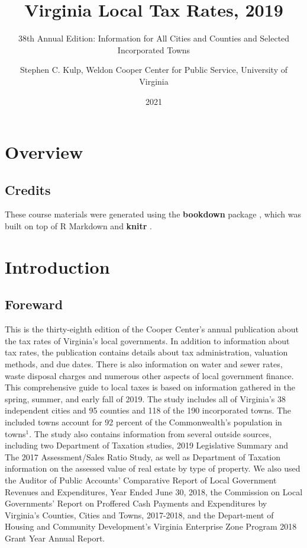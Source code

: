 \documentclass[
]{book}
\title{Virginia Local Tax Rates, 2019}
\subtitle{38th Annual Edition: Information for All Cities and Counties and Selected Incorporated Towns}
\author{Stephen C. Kulp, Weldon Cooper Center for Public Service, University of Virginia}
\date{2021}
\begin{document}
\maketitle

{
\setcounter{tocdepth}{1}
\tableofcontents
}
\hypertarget{overview}{%
\chapter{Overview}\label{overview}}

\hypertarget{credits}{%
\section{Credits}\label{credits}}

These course materials were generated using the \textbf{bookdown} package \citep{R-bookdown}, which was built on top of R Markdown and \textbf{knitr} \citep{xie2015}.

\hypertarget{introduction}{%
\chapter{Introduction}\label{introduction}}

\hypertarget{foreward}{%
\section{Foreward}\label{foreward}}

This is the thirty-eighth edition of the Cooper Center's annual publication about the tax rates of Virginia's local governments. In addition to information about tax rates, the publication contains details about tax administration, valuation methods, and due dates. There is also information on water and sewer rates, waste disposal charges and numerous other aspects of local government finance. This comprehensive guide to local taxes is based on information gathered in the spring, summer, and early fall of 2019. The study includes all of Virginia's 38 independent cities and 95 counties and 118 of the 190 incorporated towns. The included towns account for 92 percent of the Commonwealth's population in towns\(^1\). The study also contains information from several outside sources, including two Department of Taxation studies, 2019 Legislative Summary and The 2017 Assessment/Sales Ratio Study, as well as Department of Taxation information on the assessed value of real estate by type of property. We also used the Auditor of Public Accounts' Comparative Report of Local Government Revenues and Expenditures, Year Ended June 30, 2018, the Commission on Local Governments' Report on Proffered Cash Payments and Expenditures by Virginia's Counties, Cities and Towns, 2017-2018, and the Depart-ment of Housing and Community Development's Virginia Enterprise Zone Program 2018 Grant Year Annual Report.
\end{document}
